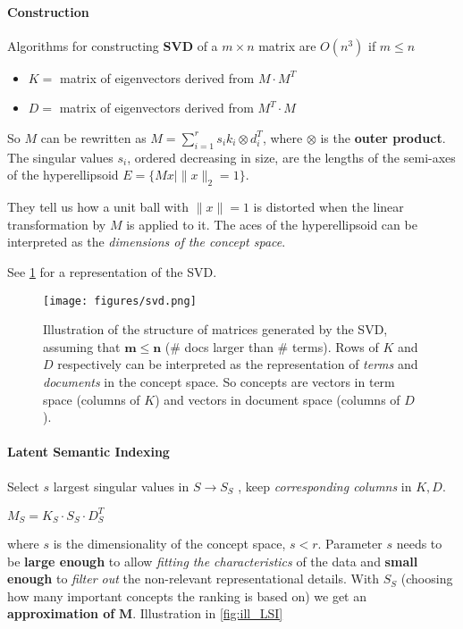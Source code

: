 \paragraph{Construction} Algorithms for constructing \textbf{SVD} of a $m \times n$ matrix are $O(n^3)$ if $m \leq n$
\begin{itemize}
  \item $K = $ matrix of eigenvectors derived from $M \cdot M^T$
  \item $D = $ matrix of eigenvectors derived from $M^T \cdot M$
\end{itemize}

So $M$ can be rewritten as $M = \sum_{i=1}^r s_i k_i \otimes d_i^T$, where $\otimes$ is the \textbf{outer product}. The singular values $s_i$, ordered decreasing in size, are the lengths of the semi-axes of the hyperellipsoid $E = \{ Mx | \|x\|_2 = 1 \}$.

They tell us how a unit ball with $\|x\| = 1$ is distorted when the linear transformation by $M$ is applied to it. The aces of the hyperellipsoid can be interpreted as the \emph{dimensions of the concept space}.

See \cref{fig:svd} for a representation of the SVD.

\begin{figure}
  \centering
  \texttt{[image: figures/svd.png]}
  \caption{Illustration of the structure of matrices generated by the SVD, assuming that $\mathbf{m \leq n}$ (\# docs larger than \# terms). Rows of $K$ and $D$ respectively can be interpreted as the representation of \emph{terms} and \emph{documents} in the concept space. So concepts are vectors in term space (columns of $K$) and vectors in document space (columns of $D$).}
  \label{fig:svd}
\end{figure}

\paragraph{Latent Semantic Indexing} Select $s$ largest singular values in $S \longrightarrow S_S$ , keep \emph{corresponding columns} in $K, D$.
\begin{center}
  $M_S = K_S \cdot S_S \cdot D_S^T$
\end{center}
where $ s$ is the dimensionality of the concept space, $s < r$. Parameter $s$ needs to be \textbf{large enough} to allow \emph{fitting the characteristics} of the data and \textbf{small enough} to \emph{filter out} the non-relevant representational details. With $S_S$ (choosing how many important concepts the ranking is based on) we get an \textbf{approximation of} $\mathbf{M}$. Illustration in \cref{fig:ill_LSI}

